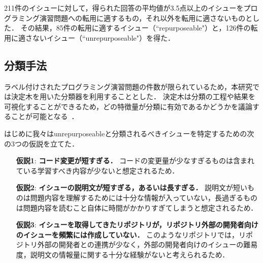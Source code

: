 211件のイシューに対して，得られた回答の平均値が3.5点以上のイシューをプログラミング演習問題への転用に適するもの，それ以外を転用に適さないものとした．
その結果，85件の転用に適するイシュー（``repurposeable"）と，126件の転用に適さないイシュー（``unrepurposeable"）を得た．


\subsection{分類手法}
% 
ラベル付けされたプログラミング演習問題の件数が限られているため，本研究では決定木を用いた分類器を利用することとした．
決定木は分類の工程や結果を可視化することができるため，どの特徴量が分類に有効であるかどうかを議論することが可能となる~\cite{FRIEDL1997399}．


はじめに我々はunrepurposeableと分類されるべきイシューを特定するための次の3つの仮説を立てた．
\begin{itemize}
\item[\textbf{仮説1}: ] \textbf{コード変更が短すぎる．} コードの変更量が少なすぎるものは含まれている学習すべき内容が少ないと想定されるため．
\item[\textbf{仮説2}: ] \textbf{イシューの説明文が短すぎる，あるいは長すぎる．} 説明文が短いものは問題内容を理解するためには十分な情報が入っていない，長過ぎるものは問題内容を読むこと自体に時間がかかりすぎてしまうと想定されるため．
\item[\textbf{仮説3}: ] \textbf{イシューを取得してきたリポジトリが，リポジトリ外部の開発者向けのイシューを頻繁には作成していない．} このようなリポジトリでは，リポジトリ外部の開発者との連携が少なく，外部の開発者向けのイシューの難易度，説明文の情報量に関する十分な経験がないと考えられるため．
\end{itemize}


